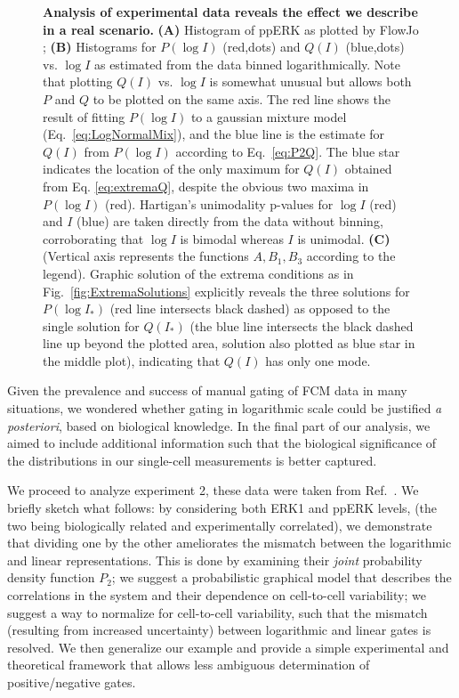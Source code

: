 \documentclass[11pt,a4paper,draft]{article}
\begin{document}
\begin{figure}[!ht]
 \centering
  \caption{\textbf{Analysis of experimental data reveals the effect we describe in a real scenario. }\textbf{(A)} Histogram of ppERK as plotted by FlowJo \cite{FlowJo}; \textbf{(B)} Histograms for $P(\log I)$ (red,dots) and $Q(I)$ (blue,dots) vs. $\log I$ as estimated from the data binned logarithmically. Note that plotting $Q(I)$ vs. $\log I$ is somewhat unusual but allows both $P$ and $Q$ to be plotted on the same axis. The red line shows the result of fitting $P(\log I)$ to a gaussian mixture model (Eq.~\ref{eq:LogNormalMix}), and the blue line is the estimate for $Q(I)$ from $P(\log I)$ according to Eq.~\ref{eq:P2Q}. The blue star indicates the location of the only maximum for $Q(I)$ obtained from Eq. \ref{eq:extremaQ}, despite the obvious two maxima in $P(\log I)$ (red). Hartigan's unimodality p-values for $\log I$ (red) and $I$ (blue) are taken directly from the data without binning, corroborating that $\log I$ is bimodal whereas $I$ is unimodal. \textbf{(C)} (Vertical axis represents the functions $A, B_1,B_3$ according to the legend). Graphic solution of the extrema conditions as in Fig.~\ref{fig:ExtremaSolutions} explicitly reveals the three solutions for $P(\log I_*)$ (red line intersects black dashed) as opposed to the single solution for $Q(I_*)$ (the blue line intersects the black dashed line up beyond the plotted area, solution also plotted as blue star in the middle plot), indicating that $Q(I)$ has only one mode.}
  \label{fig:Experiment}
\end{figure}
Given the prevalence and success of manual gating of FCM data in many situations, we wondered whether gating in logarithmic scale could be justified \emph{a posteriori}, based on biological knowledge. In the final part of our analysis, we aimed to include additional information such that the biological significance of the distributions in our single-cell measurements is better captured. 

\smallskip
We proceed to analyze experiment 2, these data were taken from Ref.~\cite{Feinerman2008}. We briefly sketch what follows: by considering both ERK1 and ppERK levels, (the two being biologically related and experimentally correlated), we demonstrate that dividing one by the other ameliorates the mismatch between the logarithmic and linear representations. This is done by examining their \emph{joint} probability density function $P_2$; we suggest a probabilistic graphical model that describes the correlations in the system and their dependence on cell-to-cell variability; we suggest a way to normalize for cell-to-cell variability, such that the mismatch (resulting from increased uncertainty) between logarithmic and linear gates is resolved. We then generalize our example and provide a simple experimental and theoretical framework that allows less ambiguous determination of positive/negative gates. 
\end{document}
